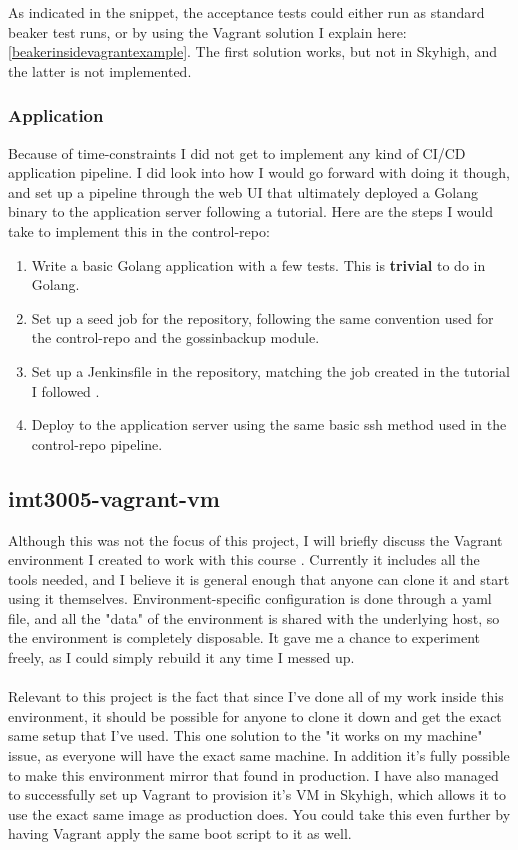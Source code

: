 As indicated in the snippet, the acceptance tests could either run as standard beaker test runs, or by using the Vagrant solution I explain here: \ref{beakerinsidevagrantexample}. The first solution works, but not in Skyhigh, and the latter is not implemented.

\subsubsection{Application} \label{applicationpipeline}

Because of time-constraints I did not get to implement any kind of CI/CD application pipeline. I did look into how I would go forward with doing it though, and set up a pipeline through the web UI that ultimately deployed a Golang\cite{golang} binary to the application server following a tutorial\cite{buidonjenkinsandpublishwithpipelines}. Here are the steps I would take to implement this in the control-repo:

\begin{enumerate}
\item Write a basic Golang application with a few tests. This is \textbf{trivial} to do in Golang.
\item Set up a seed job for the repository, following the same convention used for the control-repo and the gossinbackup module.
\item Set up a Jenkinsfile in the repository, matching the job created in the tutorial I followed \cite{buidonjenkinsandpublishwithpipelines}.
\item Deploy to the application server using the same basic ssh method used in the control-repo pipeline.
\end{enumerate}

\subsection{imt3005-vagrant-vm}

Although this was not the focus of this project, I will briefly discuss the Vagrant environment I created to work with this course \cite{tholok97vagrantvm}. Currently it includes all the tools needed, and I believe it is general enough that anyone can clone it and start using it themselves. Environment-specific configuration is done through a yaml file, and all the "data" of the environment is shared with the underlying host, so the environment is completely disposable. It gave me a chance to experiment freely, as I could simply rebuild it any time I messed up.
\\
\\
Relevant to this project is the fact that since I've done all of my work inside this environment, it should be possible for anyone to clone it down and get the exact same setup that I've used. This one solution to the "it works on my machine" issue, as everyone will have the exact same machine. In addition it's fully possible to make this environment mirror that found in production. I have also managed to successfully set up Vagrant to provision it's VM in Skyhigh, which allows it to use the exact same image as production does. You could take this even further by having Vagrant apply the same boot script to it as well.

